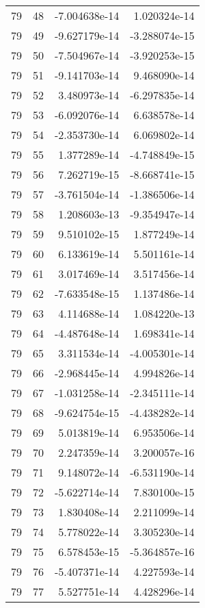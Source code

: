 \begin{tabular}{rrrr}
  79 &   48 & -7.004638e-14 &  1.020324e-14 \\
  79 &   49 & -9.627179e-14 & -3.288074e-15 \\
  79 &   50 & -7.504967e-14 & -3.920253e-15 \\
  79 &   51 & -9.141703e-14 &  9.468090e-14 \\
  79 &   52 &  3.480973e-14 & -6.297835e-14 \\
  79 &   53 & -6.092076e-14 &  6.638578e-14 \\
  79 &   54 & -2.353730e-14 &  6.069802e-14 \\
  79 &   55 &  1.377289e-14 & -4.748849e-15 \\
  79 &   56 &  7.262719e-15 & -8.668741e-15 \\
  79 &   57 & -3.761504e-14 & -1.386506e-14 \\
  79 &   58 &  1.208603e-13 & -9.354947e-14 \\
  79 &   59 &  9.510102e-15 &  1.877249e-14 \\
  79 &   60 &  6.133619e-14 &  5.501161e-14 \\
  79 &   61 &  3.017469e-14 &  3.517456e-14 \\
  79 &   62 & -7.633548e-15 &  1.137486e-14 \\
  79 &   63 &  4.114688e-14 &  1.084220e-13 \\
  79 &   64 & -4.487648e-14 &  1.698341e-14 \\
  79 &   65 &  3.311534e-14 & -4.005301e-14 \\
  79 &   66 & -2.968445e-14 &  4.994826e-14 \\
  79 &   67 & -1.031258e-14 & -2.345111e-14 \\
  79 &   68 & -9.624754e-15 & -4.438282e-14 \\
  79 &   69 &  5.013819e-14 &  6.953506e-14 \\
  79 &   70 &  2.247359e-14 &  3.200057e-16 \\
  79 &   71 &  9.148072e-14 & -6.531190e-14 \\
  79 &   72 & -5.622714e-14 &  7.830100e-15 \\
  79 &   73 &  1.830408e-14 &  2.211099e-14 \\
  79 &   74 &  5.778022e-14 &  3.305230e-14 \\
  79 &   75 &  6.578453e-15 & -5.364857e-16 \\
  79 &   76 & -5.407371e-14 &  4.227593e-14 \\
  79 &   77 &  5.527751e-14 &  4.428296e-14 \\

\end{tabular}
